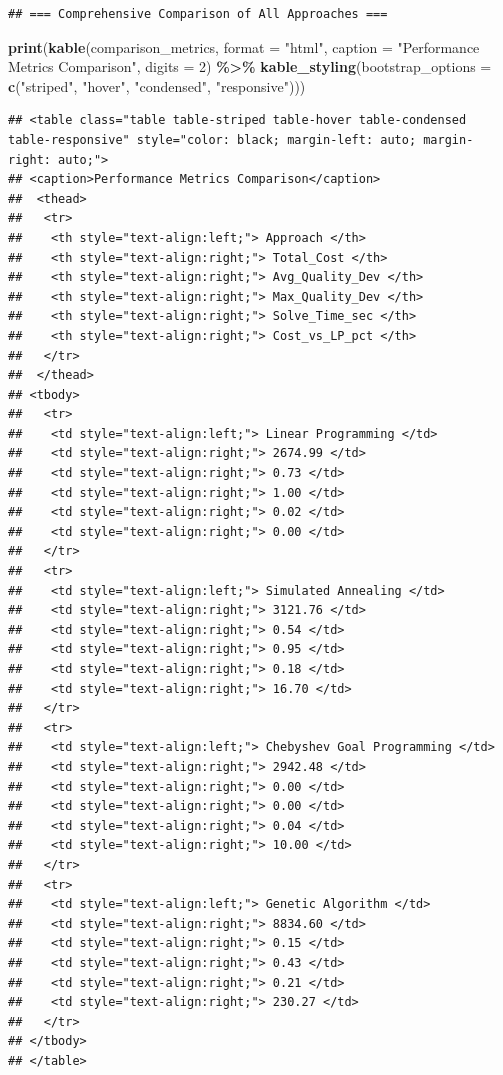 \documentclass[
]{article}
\newenvironment{Shaded}{\begin{snugshade}}{\end{snugshade}}
\newcommand{\AttributeTok}[1]{\textcolor[rgb]{0.13,0.29,0.53}{#1}}
\newcommand{\DecValTok}[1]{\textcolor[rgb]{0.00,0.00,0.81}{#1}}
\newcommand{\FunctionTok}[1]{\textcolor[rgb]{0.13,0.29,0.53}{\textbf{#1}}}
\newcommand{\NormalTok}[1]{#1}
\newcommand{\SpecialCharTok}[1]{\textcolor[rgb]{0.81,0.36,0.00}{\textbf{#1}}}
\newcommand{\StringTok}[1]{\textcolor[rgb]{0.31,0.60,0.02}{#1}}
\begin{document}
\begin{verbatim}
## === Comprehensive Comparison of All Approaches ===
\end{verbatim}

\begin{Shaded}
\begin{Highlighting}[]
\FunctionTok{print}\NormalTok{(}\FunctionTok{kable}\NormalTok{(comparison\_metrics, }\AttributeTok{format =} \StringTok{"html"}\NormalTok{, }
            \AttributeTok{caption =} \StringTok{"Performance Metrics Comparison"}\NormalTok{,}
            \AttributeTok{digits =} \DecValTok{2}\NormalTok{) }\SpecialCharTok{\%\textgreater{}\%}
      \FunctionTok{kable\_styling}\NormalTok{(}\AttributeTok{bootstrap\_options =} \FunctionTok{c}\NormalTok{(}\StringTok{"striped"}\NormalTok{, }\StringTok{"hover"}\NormalTok{, }\StringTok{"condensed"}\NormalTok{, }\StringTok{"responsive"}\NormalTok{)))}
\end{Highlighting}
\end{Shaded}

\begin{verbatim}
## <table class="table table-striped table-hover table-condensed table-responsive" style="color: black; margin-left: auto; margin-right: auto;">
## <caption>Performance Metrics Comparison</caption>
##  <thead>
##   <tr>
##    <th style="text-align:left;"> Approach </th>
##    <th style="text-align:right;"> Total_Cost </th>
##    <th style="text-align:right;"> Avg_Quality_Dev </th>
##    <th style="text-align:right;"> Max_Quality_Dev </th>
##    <th style="text-align:right;"> Solve_Time_sec </th>
##    <th style="text-align:right;"> Cost_vs_LP_pct </th>
##   </tr>
##  </thead>
## <tbody>
##   <tr>
##    <td style="text-align:left;"> Linear Programming </td>
##    <td style="text-align:right;"> 2674.99 </td>
##    <td style="text-align:right;"> 0.73 </td>
##    <td style="text-align:right;"> 1.00 </td>
##    <td style="text-align:right;"> 0.02 </td>
##    <td style="text-align:right;"> 0.00 </td>
##   </tr>
##   <tr>
##    <td style="text-align:left;"> Simulated Annealing </td>
##    <td style="text-align:right;"> 3121.76 </td>
##    <td style="text-align:right;"> 0.54 </td>
##    <td style="text-align:right;"> 0.95 </td>
##    <td style="text-align:right;"> 0.18 </td>
##    <td style="text-align:right;"> 16.70 </td>
##   </tr>
##   <tr>
##    <td style="text-align:left;"> Chebyshev Goal Programming </td>
##    <td style="text-align:right;"> 2942.48 </td>
##    <td style="text-align:right;"> 0.00 </td>
##    <td style="text-align:right;"> 0.00 </td>
##    <td style="text-align:right;"> 0.04 </td>
##    <td style="text-align:right;"> 10.00 </td>
##   </tr>
##   <tr>
##    <td style="text-align:left;"> Genetic Algorithm </td>
##    <td style="text-align:right;"> 8834.60 </td>
##    <td style="text-align:right;"> 0.15 </td>
##    <td style="text-align:right;"> 0.43 </td>
##    <td style="text-align:right;"> 0.21 </td>
##    <td style="text-align:right;"> 230.27 </td>
##   </tr>
## </tbody>
## </table>
\end{verbatim}
\end{document}
